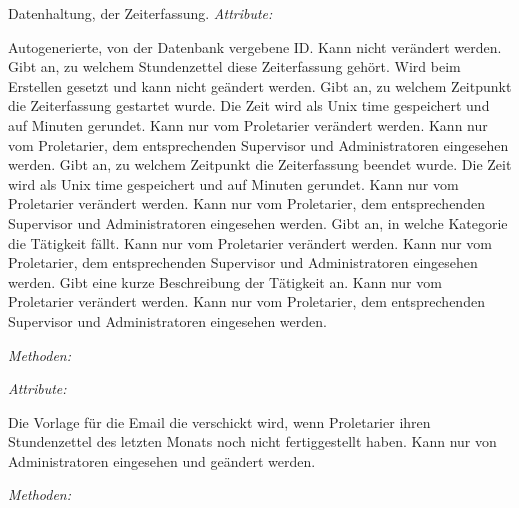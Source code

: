 \begin{itemize}
                Datenhaltung, der Zeiterfassung.
                \emph{Attribute:}
                \begin{itemize}
                        Autogenerierte, von der Datenbank vergebene ID.
                        Kann nicht verändert werden.
                        Gibt an, zu welchem Stundenzettel diese Zeiterfassung gehört.
                        Wird beim Erstellen gesetzt und kann nicht geändert werden.
                        Gibt an, zu welchem Zeitpunkt die Zeiterfassung gestartet wurde.
                        Die Zeit wird als Unix time gespeichert und auf Minuten gerundet.
                        Kann nur vom Proletarier verändert werden.
                        Kann nur vom Proletarier, dem entsprechenden Supervisor und Administratoren eingesehen werden.
                        Gibt an, zu welchem Zeitpunkt die Zeiterfassung beendet wurde.
                        Die Zeit wird als Unix time gespeichert und auf Minuten gerundet.
                        Kann nur vom Proletarier verändert werden.
                        Kann nur vom Proletarier, dem entsprechenden Supervisor und Administratoren eingesehen werden.
                        Gibt an, in welche Kategorie die Tätigkeit fällt.
                        Kann nur vom Proletarier verändert werden.
                        Kann nur vom Proletarier, dem entsprechenden Supervisor und Administratoren eingesehen werden.
                        Gibt eine kurze Beschreibung der Tätigkeit an.
                        Kann nur vom Proletarier verändert werden.
                        Kann nur vom Proletarier, dem entsprechenden Supervisor und Administratoren eingesehen werden.
                \end{itemize}
                \emph{Methoden:}
                \begin{itemize}
                \end{itemize}

                \emph{Attribute:}
                \begin{itemize}
                        Die Vorlage für die Email die verschickt wird, wenn Proletarier ihren Stundenzettel des letzten Monats noch nicht fertiggestellt haben.
                        Kann nur von Administratoren eingesehen und geändert werden.
                \end{itemize}
                \emph{Methoden:}
                \begin{itemize}
                \end{itemize}


\end{itemize}
